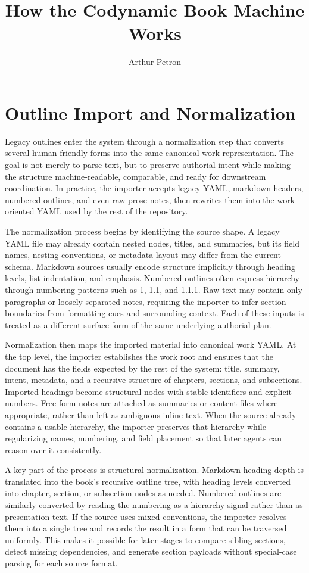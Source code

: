 \documentclass[11pt]{article}
\title{How the Codynamic Book Machine Works}
\author{Arthur Petron}
\begin{document}
\section*{Outline Import and Normalization}

Legacy outlines enter the system through a normalization step that converts several human-friendly forms into the same canonical work representation. The goal is not merely to parse text, but to preserve authorial intent while making the structure machine-readable, comparable, and ready for downstream coordination. In practice, the importer accepts legacy YAML, markdown headers, numbered outlines, and even raw prose notes, then rewrites them into the work-oriented YAML used by the rest of the repository.

The normalization process begins by identifying the source shape. A legacy YAML file may already contain nested nodes, titles, and summaries, but its field names, nesting conventions, or metadata layout may differ from the current schema. Markdown sources usually encode structure implicitly through heading levels, list indentation, and emphasis. Numbered outlines often express hierarchy through numbering patterns such as 1, 1.1, and 1.1.1. Raw text may contain only paragraphs or loosely separated notes, requiring the importer to infer section boundaries from formatting cues and surrounding context. Each of these inputs is treated as a different surface form of the same underlying authorial plan.

Normalization then maps the imported material into canonical work YAML. At the top level, the importer establishes the work root and ensures that the document has the fields expected by the rest of the system: title, summary, intent, metadata, and a recursive structure of chapters, sections, and subsections. Imported headings become structural nodes with stable identifiers and explicit numbers. Free-form notes are attached as summaries or content files where appropriate, rather than left as ambiguous inline text. When the source already contains a usable hierarchy, the importer preserves that hierarchy while regularizing names, numbering, and field placement so that later agents can reason over it consistently.

A key part of the process is structural normalization. Markdown heading depth is translated into the book's recursive outline tree, with heading levels converted into chapter, section, or subsection nodes as needed. Numbered outlines are similarly converted by reading the numbering as a hierarchy signal rather than as presentation text. If the source uses mixed conventions, the importer resolves them into a single tree and records the result in a form that can be traversed uniformly. This makes it possible for later stages to compare sibling sections, detect missing dependencies, and generate section payloads without special-case parsing for each source format.
\end{document}

